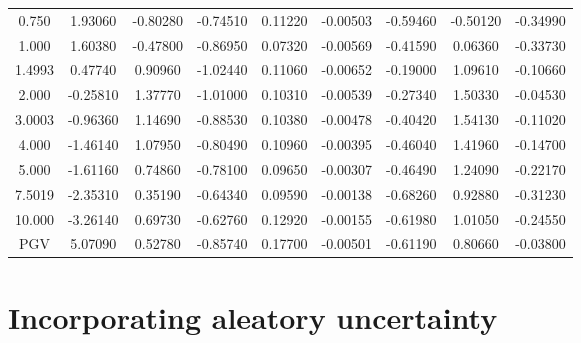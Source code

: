 \begin{table}
\begin{tabular}{ccccccccc}
0.750   & 1.93060  & -0.80280  & -0.74510  & 0.11220   & -0.00503 & -0.59460 & -0.50120 & -0.34990 \\
1.000   & 1.60380  & -0.47800  & -0.86950  & 0.07320   & -0.00569 & -0.41590 & 0.06360  & -0.33730 \\
1.4993  & 0.47740  & 0.90960   & -1.02440  & 0.11060   & -0.00652 & -0.19000 & 1.09610  & -0.10660 \\
2.000   & -0.25810 & 1.37770   & -1.01000  & 0.10310   & -0.00539 & -0.27340 & 1.50330  & -0.04530 \\
3.0003  & -0.96360 & 1.14690   & -0.88530  & 0.10380   & -0.00478 & -0.40420 & 1.54130  & -0.11020 \\
4.000   & -1.46140 & 1.07950   & -0.80490  & 0.10960   & -0.00395 & -0.46040 & 1.41960  & -0.14700 \\
5.000   & -1.61160 & 0.74860   & -0.78100  & 0.09650   & -0.00307 & -0.46490 & 1.24090  & -0.22170 \\
7.5019  & -2.35310 & 0.35190   & -0.64340  & 0.09590   & -0.00138 & -0.68260 & 0.92880  & -0.31230 \\
10.000  & -3.26140 & 0.69730   & -0.62760  & 0.12920   & -0.00155 & -0.61980 & 1.01050  & -0.24550 \\
PGV     & 5.07090  & 0.52780   & -0.85740  & 0.17700   & -0.00501 & -0.61190 & 0.80660  & -0.03800 \\
\hline
\end{tabular}
\end{table}


\normalsize

\section{Incorporating aleatory uncertainty}
\label{attn:uncertainty}

